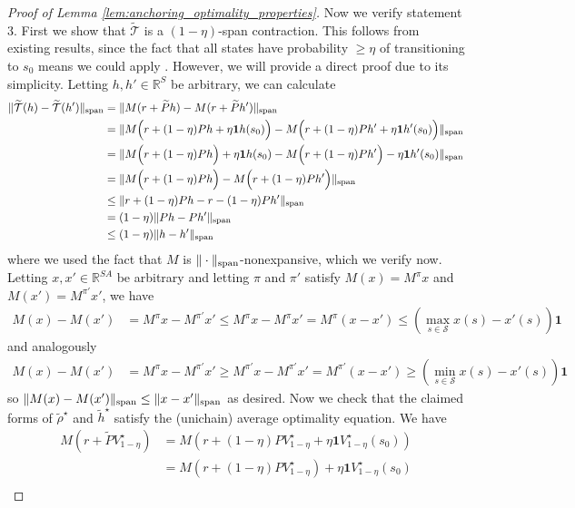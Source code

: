 \documentclass{article}
\theoremstyle{plain}
\theoremstyle{plain}
\theoremstyle{remark}
\theoremstyle{plain}
\theoremstyle{plain}
\newcommand{\R}{\mathbb{R}}
\newcommand{\one}{\mathbf{1}}
\renewcommand{\S}{\mathcal{S}}
\newcommand{\htilde}{\widetilde{h}}
\newcommand{\rhot}{\widetilde{\rho}}
\newcommand{\Topt}{\widetilde{\mathcal{T}}}
\begin{document}
\begin{proof}[Proof of Lemma \ref{lem:anchoring_optimality_properties}]
    Now we verify statement 3. First we show that $\Topt$ is a $(1-\eta)$-span contraction. This follows from existing results, since the fact that all states have probability $\geq \eta$ of transitioning to $s_0$ means we could apply \cite[Theorem 8.5.2]{puterman_markov_1994}. However, we will provide a direct proof due to its simplicity. Letting $h, h' \in \R^S$ be arbitrary, we can calculate
    \begin{align*}
        \spannorm{\Topt(h) - \Topt(h')} &= \spannorm{M(r + \widetilde{P}h) - M(r+\widetilde{P}h')} \\
        &= \spannorm{M\Big(r + (1-\eta) Ph + \eta \one h(s_0)\Big) - M\Big(r+(1-\eta) Ph' + \eta \one h'(s_0)\Big)} \\
        &= \spannorm{M\Big(r + (1-\eta) Ph  \Big) +\eta \one h(s_0) - M\Big(r+(1-\eta) Ph' \Big) - \eta \one h'(s_0)} \\
        &= \spannorm{M\Big(r + (1-\eta) Ph  \Big)  - M\Big(r+(1-\eta) Ph' \Big)} \\
        &\leq \spannorm{r + (1-\eta) Ph    - r-(1-\eta) Ph' } \\
        & = (1-\eta) \spannorm{Ph - Ph'} \\
        & \leq (1-\eta) \spannorm{h - h'}
    \end{align*}
    where we used the fact that $M$ is $\Vert \cdot\Vert _{\textnormal{span}}$-nonexpansive, which we verify now. Letting $x, x' \in \R^{SA}$ be arbitrary and letting $\pi$ and $\pi'$ satisfy $M(x) = M^\pi x$ and $M(x') = M^{\pi'} x'$, we have
    \begin{align*}
        M(x) - M(x') &= M^\pi x - M^{\pi'} x' \leq M^\pi x - M^\pi x' =M^\pi(x - x') \leq \left(\max_{s \in \S} x(s) - x'(s) \right) \one
    \end{align*}
    and analogously
    \begin{align*}
        M(x) - M(x') &= M^\pi x - M^{\pi'} x' \geq M^{\pi'} x - M^{\pi'} x' =M^{\pi'}(x - x') \geq \left(\min_{s \in \S} x(s) - x'(s) \right) \one
    \end{align*}
    so $\Vert M(x)-M(x')\Vert _{\textnormal{span}} \leq \Vert x-x'\Vert _{\textnormal{span}}$ as desired. Now we check that the claimed forms of $\rhot^\star$ and $\htilde^\star$ satisfy the (unichain) average optimality equation. We have
    \begin{align*}
        M(r + \widetilde{P} V^\star_{1-\eta}) &= M\left(r + (1-\eta) P V^\star_{1-\eta} + \eta \one V^\star_{1-\eta}(s_0)\right) \\
        &= M\left(r + (1-\eta) P V^\star_{1-\eta} \right) + \eta \one V^\star_{1-\eta}(s_0) \\

\end{align*}
\end{proof}
\end{document}
